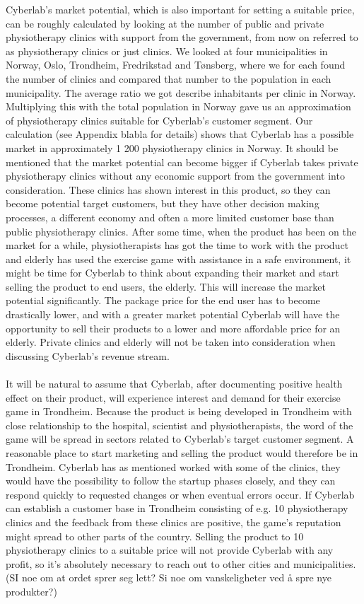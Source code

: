 Cyberlab’s market potential, which is also important for setting a suitable price, can be roughly calculated by looking at the number of public and private physiotherapy clinics with support from the government, from now on referred to as physiotherapy clinics or just clinics. We looked at four municipalities in Norway, Oslo, Trondheim, Fredrikstad and T{ø}nsberg, where we for each found the number of clinics and compared that number to the population in each municipality. The average ratio we got describe inhabitants per clinic in Norway. Multiplying this with the total population in Norway gave us an approximation of physiotherapy clinics suitable for Cyberlab's customer segment. Our calculation (see Appendix blabla for details) shows that Cyberlab has a possible market in approximately 1 200 physiotherapy clinics in Norway. It should be mentioned that the market potential can become bigger if Cyberlab takes private physiotherapy clinics without any economic support from the government into consideration. These clinics has shown interest in this product, so they can become potential target customers, but they have other decision making processes, a different economy and often a more limited customer base than public physiotherapy clinics. After some time, when the product has been on the market for a while, physiotherapists has got the time to work with the product and elderly has used the exercise game with assistance in a safe environment, it might be time for Cyberlab to think about expanding their market and start selling the product to end users, the elderly. This will increase the market potential significantly. The package price for the end user has to become drastically lower, and with a greater market potential Cyberlab will have the opportunity to sell their products to a lower and more affordable price for an elderly. Private clinics and elderly will not be taken into consideration when discussing Cyberlab's revenue stream.\\ \\
It will be natural to assume that Cyberlab, after documenting positive health effect on their product, will experience interest and demand for their exercise game in Trondheim. Because the product is being developed in Trondheim with close relationship to the hospital, scientist and physiotherapists, the word of the game will be spread in sectors related to Cyberlab's target customer segment. A reasonable place to start marketing and selling the product would therefore be in Trondheim. Cyberlab has as mentioned worked with some of the clinics, they would have the possibility to follow the startup phases closely, and they can respond quickly to requested changes or when eventual errors occur. If Cyberlab can establish a customer base in Trondheim consisting of e.g. 10 physiotherapy clinics and the feedback from these clinics are positive, the game’s reputation might spread to other parts of the country. Selling the product to 10 physiotherapy clinics to a suitable price will not provide Cyberlab with any profit, so it’s absolutely necessary to reach out to other cities and municipalities. (SI noe om at ordet sprer seg lett? Si noe om vanskeligheter ved {å} spre nye produkter?)\\ \\
